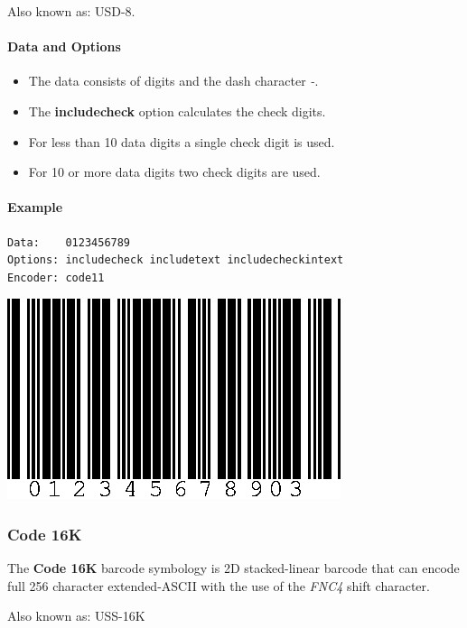 Also known as: USD-8.

\hypertarget{data-and-options-63}{%
\paragraph{Data and Options}\label{data-and-options-63}}

\begin{itemize}
\tightlist
\item
  The data consists of digits and the dash character \emph{-}.
\item
  The \textbf{includecheck} option calculates the check digits.
\item
  For less than 10 data digits a single check digit is used.
\item
  For 10 or more data digits two check digits are used.
\end{itemize}

\hypertarget{example-19}{%
\paragraph{Example}\label{example-19}}

\begin{verbatim}
Data:    0123456789
Options: includecheck includetext includecheckintext
Encoder: code11
\end{verbatim}

\includegraphics{images/code11-1.eps}

\hypertarget{code-16k}{%
\subsubsection{Code 16K}\label{code-16k}}

The \textbf{Code 16K} barcode symbology is 2D stacked-linear barcode
that can encode full 256 character extended-ASCII with the use of the
\emph{FNC4} shift character.

Also known as: USS-16K

